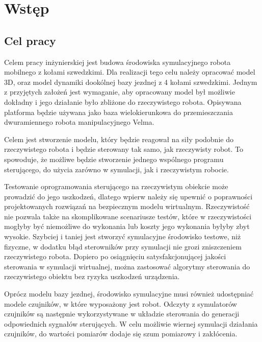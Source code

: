 \chapter{Wstęp}
\label{sec:description}
	\section{Cel pracy}
	Celem pracy inżynierskiej jest budowa środowiska symulacyjnego robota mobilnego z kołami szwedzkimi.
	Dla realizacji tego celu należy opracować model 3D, oraz model dynamiki dookólnej bazy jezdnej z 4 kołami szwedzkimi.
	Jednym z przyjętych założeń jest wymaganie, aby opracowany model był możliwie dokładny i jego działanie było zbliżone do rzeczywistego robota.
	Opisywana platforma będzie używana jako baza wielokierunkowa do przemieszczania dwuramiennego robota manipulacyjnego Velma.

	Celem jest stworzenie modelu, który będzie reagował na siły podobnie do rzeczywistego robota i będzie sterowany tak samo, jak rzeczywisty robot.
	To spowoduje, że możliwe będzie stworzenie jednego wspólnego programu sterującego, do użycia zarówno w symulacji, jak i rzeczywistym robocie.

	Testowanie oprogramowania sterującego na rzeczywistym obiekcie może prowadzić do jego uszkodzeń, 
	dlatego wpierw należy się upewnić o poprawności projektowanych rozwiązań na bezpiecznym modelu wirtualnym.
	Rzeczywistość nie pozwala także na skomplikowane scenariusze testów, które w rzeczywistości mogłyby być niemożliwe do wykonania lub koszty jego wykonania byłyby zbyt wysokie.
	Szybciej i taniej jest stworzyć symulacyjne środowisko testowe, niż fizyczne, w dodatku błąd sterowników przy symulacji nie grozi zniszczeniem rzeczywistego robota.
	Dopiero po osiągnięciu satysfakcjonującej jakości sterowania w symulacji wirtualnej, 
	można zastosować algorytmy sterowania do rzeczywistego obiektu bez ryzyka uszkodzeń urządzenia.

	Oprócz modelu bazy jezdnej, środowisko symulacyjne musi również udostępniać modele czujników, w które wyposażony jest robot. 
	Odczyty z symulatorów czujników są następnie wykorzystywane w układzie sterowania do generacji odpowiednich sygnałów sterujących.
	W celu możliwie wiernej symulacji działania czujników, do wartości pomiarów dodaje się szum pomiarowy i zakłócenia.


